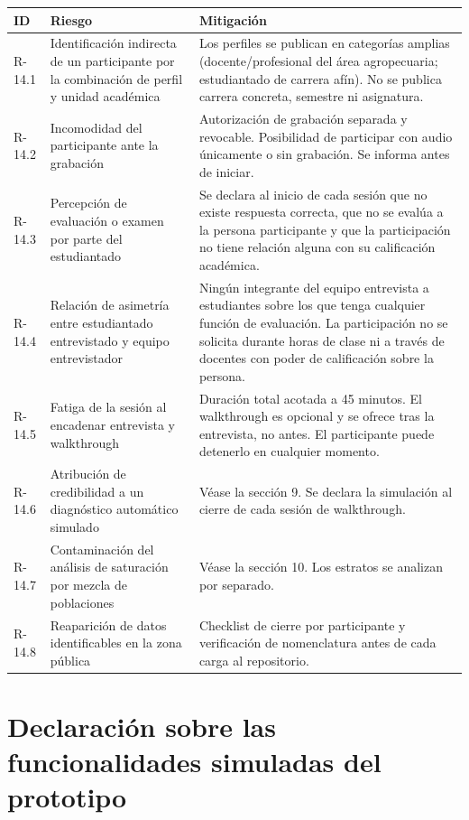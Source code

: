 \documentclass[11pt,a4paper]{article}
\begin{document}
\renewcommand{\arraystretch}{1.2}
\begin{longtable}{|C{1.5cm}|L{5.6cm}|L{8.0cm}|}
\hline
{}\textbf{ID} & \textbf{Riesgo} & \textbf{Mitigación} \\
\hline
R-14.1 & Identificación indirecta de un participante por la combinación de perfil y unidad académica &
Los perfiles se publican en categorías amplias (docente/profesional del área agropecuaria; estudiantado de
carrera afín). No se publica carrera concreta, semestre ni asignatura. \\
\hline
R-14.2 & Incomodidad del participante ante la grabación &
Autorización de grabación separada y revocable. Posibilidad de participar con audio únicamente o sin
grabación. Se informa antes de iniciar. \\
\hline
R-14.3 & Percepción de evaluación o examen por parte del estudiantado &
Se declara al inicio de cada sesión que no existe respuesta correcta, que no se evalúa a la persona
participante y que la participación no tiene relación alguna con su calificación académica. \\
\hline
R-14.4 & Relación de asimetría entre estudiantado entrevistado y equipo entrevistador &
Ningún integrante del equipo entrevista a estudiantes sobre los que tenga cualquier función de evaluación.
La participación no se solicita durante horas de clase ni a través de docentes con poder de calificación
sobre la persona. \\
\hline
R-14.5 & Fatiga de la sesión al encadenar entrevista y walkthrough &
Duración total acotada a 45 minutos. El walkthrough es opcional y se ofrece tras la entrevista, no antes.
El participante puede detenerlo en cualquier momento. \\
\hline
R-14.6 & Atribución de credibilidad a un diagnóstico automático simulado &
Véase la sección 9. Se declara la simulación al cierre de cada sesión de walkthrough. \\
\hline
R-14.7 & Contaminación del análisis de saturación por mezcla de poblaciones &
Véase la sección 10. Los estratos se analizan por separado. \\
\hline
R-14.8 & Reaparición de datos identificables en la zona pública &
Checklist de cierre por participante y verificación de nomenclatura antes de cada carga al repositorio. \\
\hline
\end{longtable}

\section{Declaración sobre las funcionalidades simuladas del prototipo}
\end{document}
